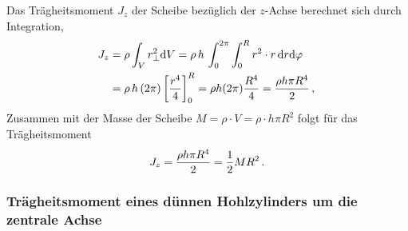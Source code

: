 Das Trägheitsmoment $J_z$ der Scheibe bezüglich der $z$-Achse berechnet sich durch Integration, 
\begin{align*}\label{eq: traegheitsmoment_Jz_duenneScheibe}
    J_z &= \rho \int_V r_{\perp}^2 \mathrm{d} V = \rho\, h \,\int_0^{2\pi} \int_0^R r^2 \cdot r \,\mathrm{d} r \mathrm{d} \varphi \\
    &= \rho\, h \,(2\pi) \left[ \frac{r^4}{4} \right]_0^R = \rho h (2\pi) \frac{R^4}{4} = \frac{\rho h \pi R^4}{2} \,{,}\,
\end{align*}
Zusammen mit der Masse der Scheibe $M = \rho \cdot V = \rho \cdot h \pi R^2$ folgt für das Trägheitsmoment
\begin{equation}
    J_z = \frac{\rho h \pi R^4}{2} = \frac{1}{2} M R^2 \,.
\end{equation}


\subsubsection{Trägheitsmoment eines dünnen Hohlzylinders um die zentrale Achse}\label{subsubsec: herleitung_traegheitsmoment_duenn_hohlzylinder}
